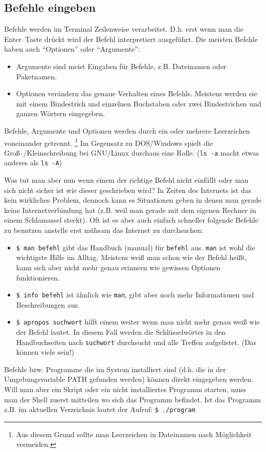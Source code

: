 \subsection{Befehle eingeben}
Befehle werden im Terminal Zeilenweise verarbeitet. D.h. erst wenn man die Enter--Taste drückt wird der Befehl interpretiert ausgeführt. Die meisten Befehle haben auch ``Optionen'' oder ``Argumente'':
\begin{itemize}
 \item Argumente sind meist Eingaben für Befehle, z.B. Dateinamen oder Paketnamen.
 \item Optionen verändern das genaue Verhalten eines Befehls. Meistens werden sie mit einem Bindestrich und einzelnen Buchstaben oder zwei Bindestrichen und ganzen Wörtern eingegeben.
\end{itemize}
Befehle, Argumente und Optionen werden durch ein oder mehrere Leerzeichen voneinander getrennt. \footnote{Aus diesem Grund sollte man Leerzeichen in Dateinamen nach Möglichkeit vermeiden.} Im Gegensatz zu DOS/Windows spielt die Groß--/Kleinschreibung bei GNU/Linux durchaus eine Rolle. (\lstinline|ls -a| macht etwas anderes als \lstinline|ls -A|)\par
Was tut man aber nun wenn einem der richtige Befehl nicht einfällt oder man sich nicht sicher ist wie dieser geschrieben wird? In Zeiten des Internets ist das kein wirkliches Problem, dennoch kann es Situationen geben in denen man gerade keine Internetverbindung hat (z.B. weil man gerade mit dem eigenen Rechner in einem Schlamassel steckt). Oft ist es aber auch einfach schneller folgende Befehle zu benutzen anstelle erst mühsam das Internet zu durchsuchen:
\begin{itemize}
 \item \lstinline|$ man befehl| gibt das Handbuch (manual) für \lstinline|befehl| aus. \lstinline|man| ist wohl die wichtigste Hilfe im Alltag. Meistens weiß man schon wie der Befehl heißt, kann sich aber nicht mehr genau erinnern wie gewissen Optionen funktionieren.
 \item \lstinline|$ info befehl| ist ähnlich wie \lstinline|man|, gibt aber noch mehr Informationen und Beschreibungen aus.
 \item \lstinline|$ apropos suchwort| hilft einem weiter wenn man nicht mehr genau weiß wie der Befehl lautet. In diesem Fall werden die Schlüsselwörter in den Handbuchseiten nach \lstinline|suchwort| durchsucht und alle Treffen aufgelistet. (Das können viele sein!)
\end{itemize}
Befehle bzw. Programme die im System installiert sind (d.h. die in der Umgebungsvariable PATH gefunden werden) können direkt eingegeben werden. Will man aber ein Skript oder ein nicht installiertes Programm starten, muss man der Shell zuerst mitteilen wo sich das Programm befindet. Ist das Programm z.B. im aktuellen Verzeichnis lautet der Aufruf: \lstinline|$ ./program|

